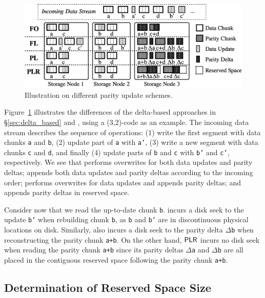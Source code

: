 \begin{figure}[!t]
    \centering
    \includegraphics[width=4.8in]{figs/schemes_chunkflow}
    \vspace{-3pt}
    \caption{Illustration on different parity update schemes.}
    \label{fig:schemes_chunkflow}
\end{figure}


Figure~\ref{fig:schemes_chunkflow} illustrates the differences of the
delta-based approaches in \S\ref{sec:delta_based} and \PLR, using a
(3,2)-code as an example.  The incoming data stream describes the sequence of
operations: (1) write the first segment with data chunks \texttt{a} and
\texttt{b}, (2) update part of \texttt{a} with \texttt{a'}, (3) write a new
segment with data chunks \texttt{c} and \texttt{d}, and finally (4) update parts
of \texttt{b} and \texttt{c} with \texttt{b'} and \texttt{c'}, respectively.  We
see that \FO performs overwrites for both data updates and parity deltas; \FL
appends both data updates and parity deltas according to the incoming order; \PL
performs overwrites for data updates and appends parity deltas; and \PLR appends
parity deltas in reserved space. 

Consider now that we read the up-to-date chunk \texttt{b}.  \FL incurs a disk
seek to the update \texttt{b'} when rebuilding chunk \texttt{b}, as 
\texttt{b} and \texttt{b'} are in discontinuous physical locations on
disk.  Similarly, \PL also incurs a disk seek to the parity delta
\texttt{$\Delta$b} when reconstructing the parity chunk \texttt{a+b}. On the
other hand,  $\textsf{PLR}$ incurs no disk seek when reading the parity chunk 
\texttt{a+b} since its parity deltas \texttt{$\Delta$a} and \texttt{$\Delta$b} are all placed
in the contiguous reserved space following the parity chunk \texttt{a+b}. 

\subsection{Determination of Reserved Space Size}
\label{sec:reserve_strategies}

